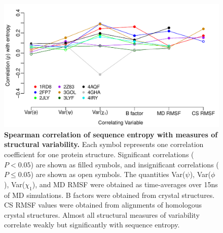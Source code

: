 \documentclass[12pt]{article}
\begin{document}
\begin{figure}[tbh]
\begin{center}
    \includegraphics[width=5in]{cor_entropy_SF.pdf}
\end{center}
\caption{\textbf{Spearman correlation of sequence entropy with measures of structural variability.} Each symbol represents one correlation coefficient for one protein structure. Significant correlations ($P<0.05$) are shown as filled symbols, and insignificant correlations ($P\leq0.05$) are shown as open symbols. The quantities Var($\psi$), Var($\phi$), Var($\chi_1$), and MD RMSF were obtained as time-averages over 15ns of MD simulations. B factors were obtained from crystal structures. CS RMSF values were obtained from alignments of homologous crystal structures. Almost all structural measures of variability correlate weakly but significantly with sequence entropy.}
\label{fig:cor_entropy_SF}
\end{figure}
\end{document}
